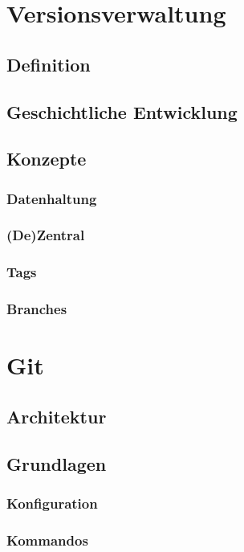 \chapter{Versionsverwaltung}
\label{cha:Versionsverwaltung}
\section{Definition}
\label{sec:Definition}
\section{Geschichtliche Entwicklung}
\label{sec:GeschichtlicheEntwicklung}
\section{Konzepte}
\label{sec:Konzepte}
\subsection{Datenhaltung}
\label{sec:Datenhaltung}
\subsection{(De)Zentral}
\label{sec:dezentral}
\subsection{Tags}
\label{sec:Tags}
\subsection{Branches}
\label{sec:Branches}

\chapter{Git}
\label{cha:Git}
\section{Architektur}
\label{sec:Architektur}
\section{Grundlagen}
\label{sec:Grundlagen}
\subsection{Konfiguration}
\label{sec:Konfiguration}
\subsection{Kommandos}
\label{sec:Kommandos}
